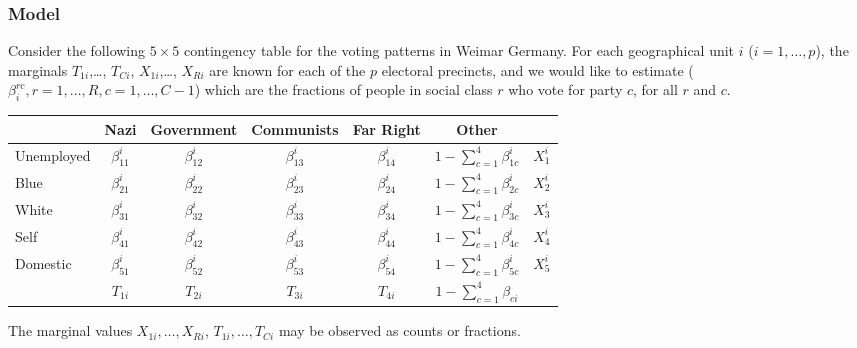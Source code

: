 \clearpage

\subsubsection{Model}
Consider the following $5 \times 5$ contingency table for the voting
patterns in Weimar Germany.  For each geographical unit $i$ ($i = 1,
\dots, p$), the marginals $T_{1i}$,\dots, $T_{Ci}$, $X_{1i}$,\dots,
$X_{Ri}$ are known for each of the $p$ electoral precincts, and we
would like to estimate ($\beta_i^{rc}, r=1,\dots,R, c=1,\dots,C-1$)
which are the fractions of people in social class $r$ who vote for
party $c$, for all $r$ and $c$.
\begin{table}[!h]
  \begin{center}
    \begin{tabular}{l|ccccc|c}
      & Nazi  & Government & Communists & Far Right & Other         \\
      \hline
      Unemployed & $\beta_{11}^{i}$  & $\beta_{12}^{i}$ & $\beta_{13}^{i}$  & $\beta_{14}^{i}$  & $1-\sum_{c=1}^4 \beta_{1c}^i$ & $X_1^i$   \\
      Blue  & $\beta_{21}^{i}$  & $\beta_{22}^{i}$ & $\beta_{23}^{i}$  & $\beta_{24}^{i}$  & $1-\sum_{c=1}^4 \beta_{2c}^i$ & $X_2^i$   \\
      White  & $\beta_{31}^{i}$  & $\beta_{32}^{i}$ & $\beta_{33}^{i}$  & $\beta_{34}^{i}$  & $1-\sum_{c=1}^4 \beta_{3c}^i$ & $X_3^i$   \\
      Self  & $\beta_{41}^{i}$  & $\beta_{42}^{i}$ & $\beta_{43}^{i}$  & $\beta_{44}^{i}$  & $1-\sum_{c=1}^4 \beta_{4c}^i$ & $X_4^i$   \\
      Domestic  & $\beta_{51}^{i}$  & $\beta_{52}^{i}$ & $\beta_{53}^{i}$  & $\beta_{54}^{i}$  & $1-\sum_{c=1}^4 \beta_{5c}^i$ & $X_5^i$   \\
      \hline
      & $T_{1i}$ & $T_{2i}$  & $T_{3i}$      & $T_{4i}$  & $1-\sum_{c=1}^4 \beta_{ci}$
    \end{tabular}
  \end{center}
\end{table}

\noindent 
The marginal values $X_{1i},\dots,X_{Ri}$, $T_{1i},\dots,T_{Ci}$ may be
observed as counts or fractions.

